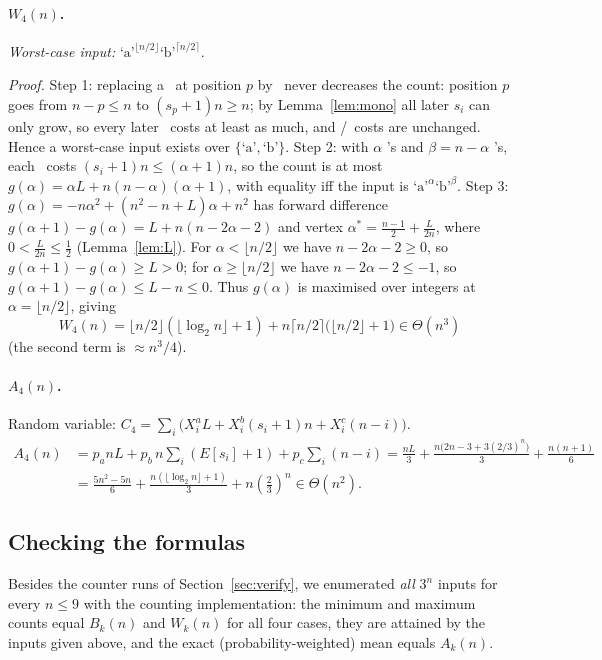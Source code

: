 \documentclass[11pt]{article}
\newcommand{\lgn}{\lfloor \log_2 n \rfloor}
\newcommand{\cha}{\text{`a'}}
\newcommand{\chb}{\text{`b'}}
\newcommand{\chc}{\text{`c'}}
\theoremstyle{remark}
\begin{document}
\paragraph{$W_4(n)$.} \emph{Worst-case input:}
$\cha^{\lfloor n/2\rfloor}\chb^{\lceil n/2\rceil}$.

\emph{Proof.} Step 1: replacing a \chc\ at position $p$ by \chb\ never decreases the count:
position $p$ goes from $n-p\le n$ to $(s_p+1)n\ge n$; by Lemma~\ref{lem:mono} all later
$s_i$ can only grow, so every later \chb\ costs at least as much, and \cha/\chc\ costs are
unchanged. Hence a worst-case input exists over $\{\cha,\chb\}$.
Step 2: with $\alpha$ \cha's and $\beta=n-\alpha$ \chb's, each \chb\ costs
$(s_i+1)n\le(\alpha+1)n$, so the count is at most $g(\alpha)=\alpha L+n(n-\alpha)(\alpha+1)$,
with equality iff the input is $\cha^\alpha\chb^\beta$.
Step 3: $g(\alpha)=-n\alpha^2+(n^2-n+L)\alpha+n^2$ has forward difference
$g(\alpha+1)-g(\alpha)=L+n(n-2\alpha-2)$ and vertex
$\alpha^*=\frac{n-1}{2}+\frac{L}{2n}$, where $0<\frac{L}{2n}\le\frac12$ (Lemma~\ref{lem:L}).
For $\alpha<\lfloor n/2\rfloor$ we have $n-2\alpha-2\ge 0$, so $g(\alpha+1)-g(\alpha)\ge L>0$;
for $\alpha\ge\lfloor n/2\rfloor$ we have $n-2\alpha-2\le -1$, so $g(\alpha+1)-g(\alpha)\le L-n\le 0$.
Thus $g(\alpha)$ is maximised over integers at $\alpha=\lfloor n/2\rfloor$, giving
\[
W_4(n)=\lfloor n/2\rfloor(\lgn+1)+n\lceil n/2\rceil\bigl(\lfloor n/2\rfloor+1\bigr)\in\Theta(n^3)
\]
(the second term is $\approx n^3/4$).

\paragraph{$A_4(n)$.} Random variable: $C_4=\sum_i\bigl(X_i^aL+X_i^b(s_i+1)n+X_i^c(n-i)\bigr)$.
\begin{align*}
A_4(n)&=p_a nL+p_b\,n\sum_i(E[s_i]+1)+p_c\sum_i(n-i)
=\frac{nL}{3}+\frac{n\bigl(2n-3+3(2/3)^n\bigr)}{3}+\frac{n(n+1)}{6}\\
&=\frac{5n^2-5n}{6}+\frac{n(\lgn+1)}{3}+n\left(\tfrac23\right)^n\in\Theta(n^2).
\end{align*}

\subsection*{Checking the formulas}
Besides the counter runs of Section~\ref{sec:verify}, we enumerated \emph{all} $3^n$
inputs for every $n\le 9$ with the counting implementation: the minimum and maximum
counts equal $B_k(n)$ and $W_k(n)$ for all four cases, they are attained by the inputs given
above, and the exact (probability-weighted) mean equals $A_k(n)$.
\end{document}
